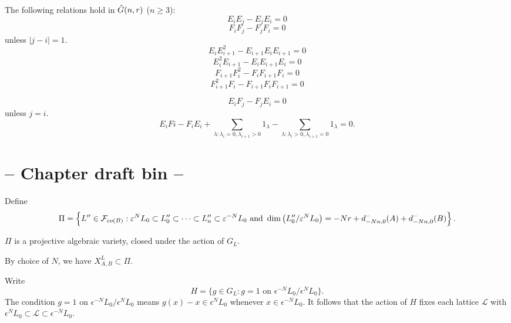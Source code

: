 \documentclass[a4paper, 11pt]{report}
\begin{document}
\begin{lemma}
The following relations hold in $\hat{G}(n,r)$ ($n\geq 3$):
\begin{equation*}
E_iE_j - E_jE_i = 0
\end{equation*}
\begin{equation*}
F_iF_j - F_jF_i = 0
\end{equation*}
unless $|j-i|=1$.
\begin{equation*}
E_iE_{i+1}^2 - E_{i+1}E_iE_{i+1} = 0
\end{equation*}
\begin{equation*}
E_i^2E_{i+1} - E_iE_{i+1}E_i = 0
\end{equation*}
\begin{equation*}
F_{i+1}F_i^2 - F_iF_{i+1}F_i = 0
\end{equation*}
\begin{equation*}
F_{i+1}^2F_i - F_{i+1}F_iF_{i+1} = 0
\end{equation*}

\begin{equation*}
E_iF_j - F_jE_i = 0
\end{equation*}
unless $j=i$.
\begin{equation*}
E_iFi - F_iE_i + \sum_{\lambda:\lambda_i = 0,\lambda_{i+1}>0} 1_\lambda - \sum_{\lambda:\lambda_i>0, \lambda_{i+1}=0} 1_\lambda = 0.
\end{equation*}
\end{lemma}


\section{ -- Chapter draft bin -- }

Define
\begin{equation*}
\Pi = \left\{L''\in\mathcal{F}_{co(B)} : \varepsilon^N L_0 \subset L_0''\subset\cdots\subset L_n''\subset \varepsilon^{-N} L_0 \text{ and } \dim\left(L_0''/{\varepsilon^N L_0}\right) = -Nr + d_{-Nn,0}^-(A) + d_{-Nn,0}^-(B) \right\}.
\end{equation*}

\begin{lemma}
$\Pi$ is a projective algebraic variety, closed under the action of $G_L$.
\end{lemma}

By choice of $N$, we have $X_{A,B}^L\subset\Pi$.

Write
\begin{equation*}
H = \{g\in G_L: g=1 \text{ on } \epsilon^{-N}L_0/{\epsilon^N L_0}\}.
\end{equation*}
The condition $g=1$ on $\epsilon^{-N}L_0/{\epsilon^N L_0}$ means $g(x) - x\in \epsilon^N L_0$ whenever $x\in\epsilon^{-N} L_0$. It follows that the action of $H$ fixes each lattice $\mathcal{L}$ with $\epsilon^N L_0\subset \mathcal{L}\subset \epsilon^{-N}L_0$.
\end{document}
